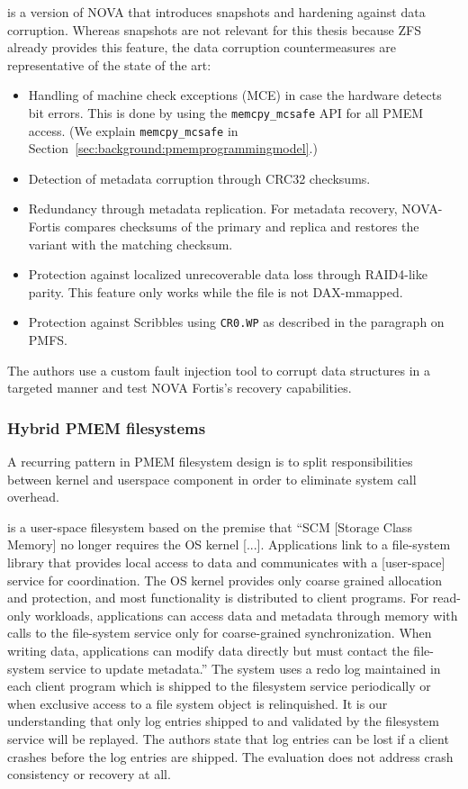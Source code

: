 \documentclass[12pt,a4paper,twoside]{book}
\begin{document}
 is a version of NOVA that introduces snapshots and hardening against data corruption.
Whereas snapshots are not relevant for this thesis because ZFS already provides this feature, the data corruption countermeasures are representative of the state of the art:
\begin{itemize}[noitemsep,beginpenalty=100000,midpenalty=100000]
    \item Handling of machine check exceptions (MCE) in case the hardware detects bit errors.
          This is done by using the \lstinline{memcpy_mcsafe} API for all PMEM access.
          (We explain \lstinline{memcpy_mcsafe} in Section~\ref{sec:background:pmemprogrammingmodel}.)
    \item Detection of metadata corruption through CRC32 checksums.
    \item Redundancy through metadata replication. For metadata recovery, NOVA-Fortis compares checksums of the primary and replica and restores the variant with the matching checksum.
    \item Protection against localized unrecoverable data loss through RAID4-like parity.
          This feature only works while the file is not DAX-mmapped.
    \item Protection against Scribbles using \lstinline{CR0.WP} as described in the paragraph on PMFS.
\end{itemize}
The authors use a custom fault injection tool to corrupt data structures in a targeted manner and test NOVA Fortis's recovery capabilities.

\subsubsection{Hybrid PMEM filesystems}\label{sec:hybrid_pmem_file_systems}
A recurring pattern in PMEM filesystem design is to split responsibilities between kernel and userspace component in order to eliminate system call overhead.

 is a user-space filesystem based on the premise that
“SCM [Storage Class Memory] no longer requires the OS kernel [...].
Applications link to a file-system library that provides local access to data and communicates with a [user-space] service for coordination.
The OS kernel provides only coarse grained allocation and protection, and most functionality is distributed to client programs.
For read-only workloads, applications can access data and metadata through memory with calls to the file-system service only for coarse-grained synchronization.
When writing data, applications can modify data directly but must contact the file-system service to update metadata.”
The system uses a redo log maintained in each client program which is shipped to the filesystem service periodically or when exclusive access to a file system object is relinquished.
It is our understanding that only log entries shipped to and validated by the filesystem service will be replayed.
The authors state that log entries can be lost if a client crashes before the log entries are shipped.
The evaluation does not address crash consistency or recovery at all.
\end{document}
